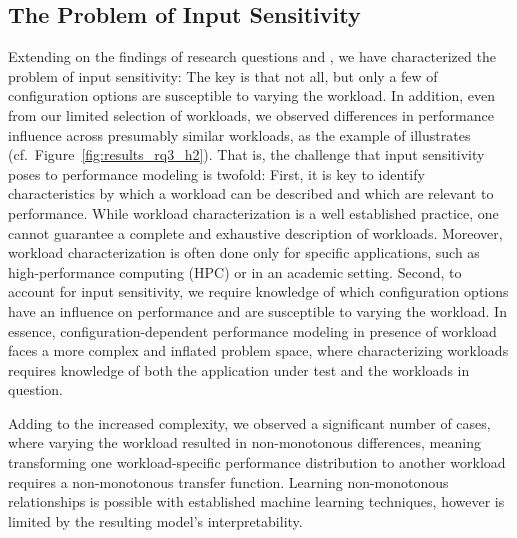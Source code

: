 \subsection{The Problem of Input Sensitivity}\label{sec:discusssion_challenge}
Extending on the findings of research questions  and , we have characterized the problem of input sensitivity: The key is that not all, but only a few of configuration options are susceptible to varying the workload.  In addition, even from our limited selection of workloads, we observed differences in performance influence across presumably similar workloads, as the example of \htwo illustrates (cf.~Figure~\ref{fig:results_rq3_h2}). That is, the challenge that input sensitivity poses to performance modeling is twofold: First, it is key to identify characteristics by which a workload can be described and which are relevant to performance. While workload characterization is a well established practice, one cannot guarantee a complete and exhaustive description of workloads. Moreover, workload characterization is often done only for specific applications, such as high-performance computing (HPC) or in an academic setting. Second, to account for input sensitivity, we require knowledge of which configuration options have an influence on performance and are susceptible to varying the workload. In essence, configuration-dependent performance modeling in presence of workload faces a more complex and inflated problem space, where characterizing workloads requires knowledge of both the application under test and the workloads in question.

Adding to the increased complexity, we observed a significant number of cases, where varying the workload resulted in non-monotonous differences, meaning transforming one workload-specific performance distribution to another workload requires a non-monotonous transfer function. Learning non-monotonous relationships is possible with established machine learning techniques, however is limited by the resulting model's interpretability. 

